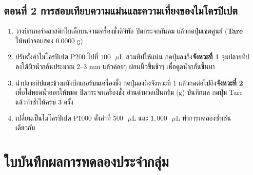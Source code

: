 \subsection{ตอนที่ 2 การสอบเทียบความแม่นและความเที่ยงของไมโครปิเปต}
\begin{enumerate}
    \item วางบีกเกอร์พลาสติกใบเล็กบนจานเครื่องชั่งดิจิทัล ปิดกระจกกันลม แล้วกดปุ่มเซตศูนย์ (\textbf{Tare} ให้หน้าจอแสดง $0.0000\text{ g}$)
    \item ปรับตั้งค่าไมโครปิเปต P200 ไปที่ $100\text{ }\mu\text{L}$ สวมทิปให้แน่น กดปุ่มลงถึง\textbf{จังหวะที่ 1} จุ่มปลายทิปลงใต้ผิวน้ำกลั่นประมาณ $2\text{--}3\text{ mm}$ แล้วค่อยๆ ผ่อนนิ้วขึ้นช้าๆ เพื่อดูดน้ำกลั่นขึ้นมา
    \item นำปลายทิปแตะข้างผนังบีกเกอร์บนเครื่องชั่ง กดปุ่มลงถึงจังหวะที่ 1 แล้วกดต่อไปถึง\textbf{จังหวะที่ 2} เพื่อไล่หยดน้ำออกให้หมด ปิดกระจกเครื่องชั่ง อ่านค่ามวลเป็นกรัม ($\text{g}$) บันทึกผล กดปุ่ม Tare แล้วทำซ้ำให้ครบ 3 ครั้ง
    \item เปลี่ยนเป็นไมโครปิเปต P1000 ตั้งค่าที่ $500\text{ }\mu\text{L}$ และ $1{,}000\text{ }\mu\text{L}$ ทำการทดลองซ้ำเช่นเดียวกัน
\end{enumerate}

\section{ใบบันทึกผลการทดลองประจำกลุ่ม}

